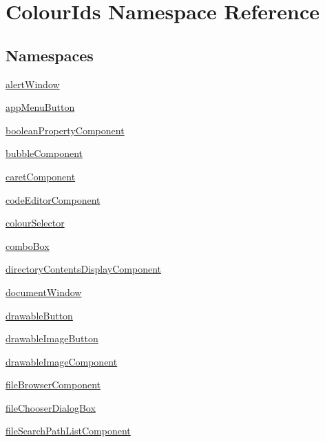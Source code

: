 \hypertarget{namespaceColourIds}{}\section{Colour\+Ids Namespace Reference}
\label{namespaceColourIds}
\subsection*{Namespaces}
\begin{DoxyCompactItemize}
\item 
 \mbox{\hyperlink{namespaceColourIds_1_1alertWindow}{alert\+Window}}
\item 
 \mbox{\hyperlink{namespaceColourIds_1_1appMenuButton}{app\+Menu\+Button}}
\item 
 \mbox{\hyperlink{namespaceColourIds_1_1booleanPropertyComponent}{boolean\+Property\+Component}}
\item 
 \mbox{\hyperlink{namespaceColourIds_1_1bubbleComponent}{bubble\+Component}}
\item 
 \mbox{\hyperlink{namespaceColourIds_1_1caretComponent}{caret\+Component}}
\item 
 \mbox{\hyperlink{namespaceColourIds_1_1codeEditorComponent}{code\+Editor\+Component}}
\item 
 \mbox{\hyperlink{namespaceColourIds_1_1colourSelector}{colour\+Selector}}
\item 
 \mbox{\hyperlink{namespaceColourIds_1_1comboBox}{combo\+Box}}
\item 
 \mbox{\hyperlink{namespaceColourIds_1_1directoryContentsDisplayComponent}{directory\+Contents\+Display\+Component}}
\item 
 \mbox{\hyperlink{namespaceColourIds_1_1documentWindow}{document\+Window}}
\item 
 \mbox{\hyperlink{namespaceColourIds_1_1drawableButton}{drawable\+Button}}
\item 
 \mbox{\hyperlink{namespaceColourIds_1_1drawableImageButton}{drawable\+Image\+Button}}
\item 
 \mbox{\hyperlink{namespaceColourIds_1_1drawableImageComponent}{drawable\+Image\+Component}}
\item 
 \mbox{\hyperlink{namespaceColourIds_1_1fileBrowserComponent}{file\+Browser\+Component}}
\item 
 \mbox{\hyperlink{namespaceColourIds_1_1fileChooserDialogBox}{file\+Chooser\+Dialog\+Box}}
\item 
 \mbox{\hyperlink{namespaceColourIds_1_1fileSearchPathListComponent}{file\+Search\+Path\+List\+Component}}

\end{DoxyCompactItemize}
